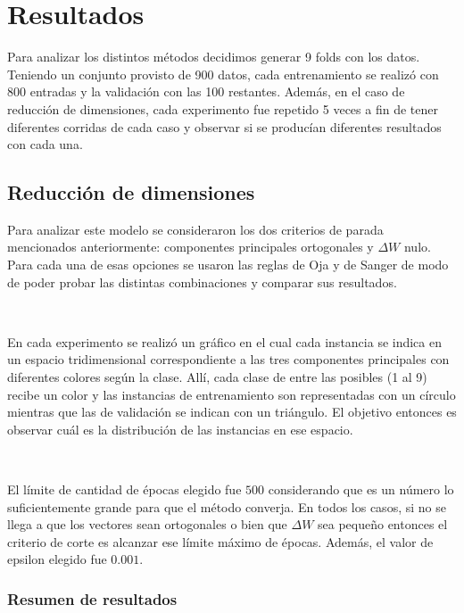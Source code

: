\documentclass[informe.tex]{subfiles}
\begin{document}
  
  \section{Resultados}
    Para analizar los distintos métodos decidimos generar 9 folds con los datos. Teniendo un conjunto provisto de 900 datos, cada entrenamiento se realiz\'o con 800 entradas y la validación con las 100 restantes. Además, en el caso de reducción de dimensiones, cada experimento fue repetido 5 veces a fin de tener diferentes corridas de cada caso y observar si se produc\'ian diferentes resultados con cada una.
    
    \subsection{Reducción de dimensiones}
      Para analizar este modelo se consideraron los dos criterios de parada mencionados anteriormente: componentes principales ortogonales y $\Delta W$ nulo. Para cada una de esas opciones se usaron las reglas de Oja y de Sanger de modo de poder probar las distintas combinaciones y comparar sus resultados. 
      
      ~
      
      En cada experimento se realizó un gráfico en el cual cada instancia se indica en un espacio tridimensional correspondiente a las tres componentes principales con diferentes colores según la clase. Allí, cada clase de entre las posibles (1 al 9) recibe un color y las instancias de entrenamiento son representadas con un círculo mientras que las de validación se indican con un triángulo. El objetivo entonces es observar cuál es la distribución de las instancias en ese espacio.
      
      ~
      
      El l\'imite de cantidad de \'epocas elegido fue $500$ considerando que es un n\'umero lo suficientemente grande para que el método converja. En todos los casos, si no se llega a que los vectores sean ortogonales o bien que $\Delta W$ sea pequeño entonces el criterio de corte es alcanzar ese límite máximo de épocas. Además, el valor de epsilon elegido fue $0.001$.

      \subsubsection{Resumen de resultados}
      
\end{document}
